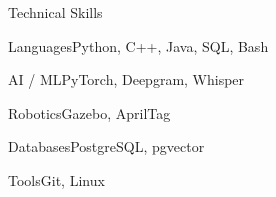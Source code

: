 \documentclass[
	11pt
]{../../../template}
\begin{document}
	\begin{rSection}{T}{echnical Skills}
		\begin{rSet}{Languages}{Python, C++, Java, SQL, Bash}
		\end{rSet}
		\begin{rSet}{AI / ML}{PyTorch, Deepgram, Whisper}
		\end{rSet}
		\begin{rSet}{Robotics}{Gazebo, AprilTag}
		\end{rSet}
		\begin{rSet}{Databases}{PostgreSQL, pgvector}
		\end{rSet}
		\begin{rSet}{Tools}{Git, Linux}
		\end{rSet}
	\end{rSection}
\end{document}
